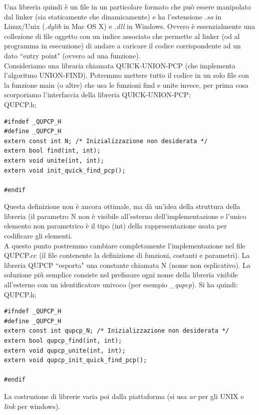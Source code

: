 \documentclass[a4paper,12pt, oneside]{book}
\begin{document}
Una libreria quindi è un file in un particolare formato che può essere manipolato dal
linker (sia staticamente che dinamicamente) e ha l’estensione \textit{.so} in Linux/Unix (\textit{.dylib} in Mac OS X) e \textit{.dll} in Windows. Ovvero è essenzialmente una collezione di file oggetto con
un indice associato che permette al linker (od al programma in esecuzione) di andare a caricare il codice corrispondente ad un dato “entry point" (ovvero ad una funzione).\\
Consideriamo una libraria chiamata QUICK-UNION-PCP (che
implementa l’algoritmo UNION-FIND). Potremmo mettere tutto il codice in un solo file con la funzione main (o
altre) che usa le funzioni find e unite invece, per prima cosa scorporiamo l’interfaccia della libreria
QUICK-UNION-PCP:\\
QUPCP.h;
\begin{verbatim}
#ifndef _QUPCP_H
#define _QUPCP_H
extern const int N; /* Inizializzazione non desiderata */
extern bool find(int, int);
extern void unite(int, int);
extern void init_quick_find_pcp();

#endif
\end{verbatim}
Questa definizione non è ancora ottimale, ma dà un’idea della
struttura della libreria (il parametro N non è visibile all’esterno dell’implementazione e l’unico elemento non parametrico è il tipo (int) della
rappresentazione usata per codificare gli elementi.\\
A questo punto postremmo cambiare completamente
l’implementazione nel file QUPCP.cc (il file contenente la
definizione di funzioni, costanti e parametri). La libreria QUPCP “esporta" una constante chiamata N (nome non esplicativo). La soluzione più semplice consiste nel prefissare ogni nome
della libreria visibile all’esterno con un identificatore univoco (per esempio \textit{\_qupcp}). Si ha quindi:
QUPCP.h;
\begin{verbatim}
#ifndef _QUPCP_H
#define _QUPCP_H
extern const int qupcp_N; /* Inizializzazione non desiderata */
extern bool qupcp_find(int, int);
extern void qupcp_unite(int, int);
extern void qupcp_init_quick_find_pcp();

#endif
\end{verbatim}
La costruzione di librerie varia poi dalla piattaforma (si usa \textit{ar} per gli UNIX e \textit{link} per windows).
\end{document}

